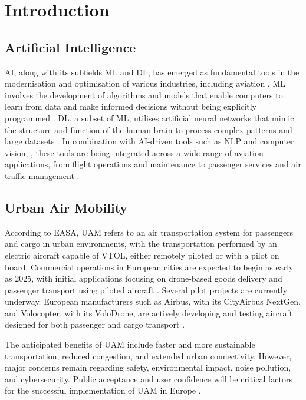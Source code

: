 \section{Introduction}


\subsection{Artificial Intelligence}

\Gls{AI}, along with its subfields \gls{ML} and \gls{DL}, has emerged as fundamental tools in the modernisation and optimisation of various industries, including aviation \cite{Tafur_2025}.
\gls{ML} involves the development of algorithms and models that enable computers to learn from data and make informed decisions without being explicitly programmed \cite{Tafur_2025}. 
\gls{DL}, a subset of \gls{ML}, utilises artificial neural networks that mimic the structure and function of the human brain to process complex patterns and large datasets \cite{Tafur_2025}. 
In combination with \gls{AI}-driven tools such as \gls{NLP} and computer vision, , these tools are being integrated across a wide range of aviation applications, from flight operations and maintenance to passenger services and air traffic management \cite{Tafur_2025}.


\subsection{Urban Air Mobility}
According to \gls{EASA}, \gls{UAM} refers to an air transportation system for passengers and cargo in urban environments, with the transportation performed by an electric aircraft capable of \gls{VTOL}, either remotely piloted or with a pilot on board. 
Commercial operations in European cities are expected to begin as early as 2025, with initial applications focusing on drone-based goods delivery and passenger transport using piloted aircraft \cite{easa_uam}. 
Several pilot projects are currently underway. 
European manufacturers such as Airbus, with its CityAirbus NextGen, and Volocopter, with its VoloDrone, are actively developing and testing aircraft designed for both passenger and cargo transport \cite{gomez2024uam}.

The anticipated benefits of \gls{UAM} include faster and more sustainable transportation, reduced congestion, and extended urban connectivity. 
However, major concerns remain regarding safety, environmental impact, noise pollution, and cybersecurity.
Public acceptance and user confidence will be critical factors for the successful implementation of \gls{UAM} in Europe \cite{easa_uamlandscape}.

